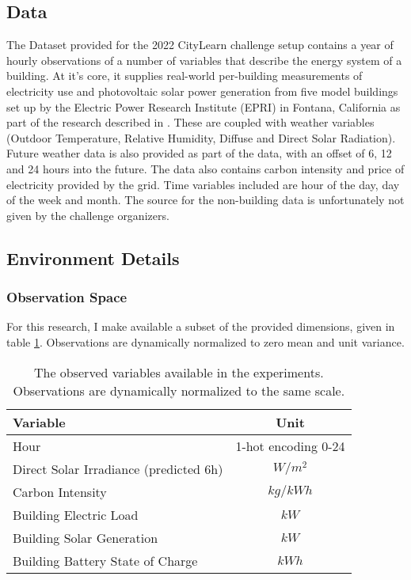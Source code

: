 \subsection{Data}
The Dataset provided for the 2022 CityLearn challenge setup contains a year of hourly observations of a number of variables that describe the energy system of a building.
At it's core, it supplies real-world per-building measurements of electricity use and photovoltaic solar power generation from five model buildings set up by the Electric Power Research Institute (EPRI) in Fontana, California as part of the research described in \cite{narayanamurthyGridIntegrationZero}.
These are coupled with weather variables (Outdoor Temperature, Relative Humidity, Diffuse and Direct Solar Radiation).
Future weather data is also provided as part of the data, with an offset of 6, 12 and 24 hours into the future.
The data also contains carbon intensity and price of electricity provided by the grid.
Time variables included are hour of the day, day of the week and month.
The source for the non-building data is unfortunately not given by the challenge organizers.

\subsection{Environment Details}
\subsubsection{Observation Space}
For this research, I make available a subset of the provided dimensions, given in table \ref{tab:observations}. Observations are dynamically normalized to zero mean and unit variance.

\begin{table}[h]
    \caption{The observed variables available in the experiments. Observations are dynamically normalized to the same scale.} \label{tab:observations}
    \centering
    \begin{tabular}{l|c}
        Variable & Unit \\ \hline
        Hour & 1-hot encoding 0-24 \\
        Direct Solar Irradiance (predicted 6h) & $W/m^2$ \\
        Carbon Intensity & $kg/kWh$ \\
        Building Electric Load & $kW$\\
        Building Solar Generation & $kW$\\
        Building Battery State of Charge & $kWh$\\
    \end{tabular}
\end{table}

